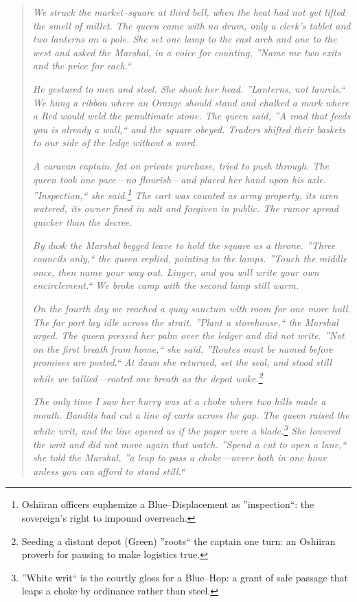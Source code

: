 \documentclass[11pt]{article}
\begin{document}
\begin{quote}\small
\emph{We struck the market--square at third bell, when the heat had not yet lifted the smell of millet. The queen came with no drum, only a clerk's tablet and two lanterns on a pole. She set one lamp to the east arch and one to the west and asked the Marshal, in a voice for counting, ''Name me two exits and the price for each.``}

\emph{He gestured to men and steel. She shook her head. ''Lanterns, not laurels.`` We hung a ribbon where an Orange should stand and chalked a mark where a Red would weld the penultimate stone. The queen said, ''A road that feeds you is already a wall,`` and the square obeyed. Traders shifted their baskets to our side of the ledge without a word.}

\emph{A caravan captain, fat on private purchase, tried to push through. The queen took one pace---no flourish---and placed her hand upon his axle. ''\textit{Inspection},`` she said.\footnote{Oshiiran officers euphemize a Blue--Displacement as ''inspection``: the sovereign's right to impound overreach.} The cart was counted as army property, its oxen watered, its owner fined in salt and forgiven in public. The rumor spread quicker than the decree.}

\emph{By dusk the Marshal begged leave to hold the square as a throne. ''Three councils only,`` the queen replied, pointing to the lamps. ''Touch the middle once, then name your way out. Linger, and you will write your own encirclement.`` We broke camp with the second lamp still warm.}

\emph{On the fourth day we reached a quay sanctum with room for one more hull. The far port lay idle across the strait. ''Plant a storehouse,`` the Marshal urged. The queen pressed her palm over the ledger and did not write. ''Not on the first breath from home,`` she said. ''Routes must be named before promises are posted.`` At dawn she returned, set the seal, and stood still while we tallied---rooted one breath as the depot woke.\footnote{Seeding a distant depot (Green) ''roots`` the captain one turn: an Oshiiran proverb for pausing to make logistics true.}}

\emph{The only time I saw her hurry was at a choke where two hills made a mouth. Bandits had cut a line of carts across the gap. The queen raised the white writ, and the line opened as if the paper were a blade.\footnote{''White writ`` is the courtly gloss for a Blue--Hop: a grant of safe passage that leaps a choke by ordinance rather than steel.} She lowered the writ and did not move again that watch. ''Spend a cut to open a lane,`` she told the Marshal, ''a leap to pass a choke---never both in one hour unless you can afford to stand still.``}


\end{quote}
\end{document}
